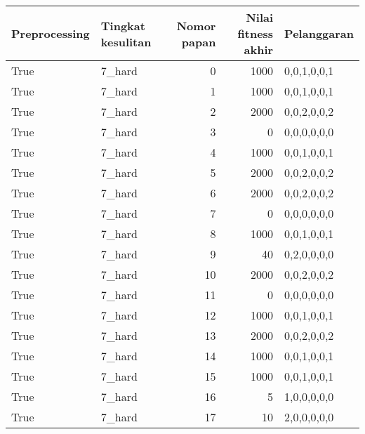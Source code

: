\begin{tabular}{llrrl}
\hline
 Preprocessing   & Tingkat kesulitan   &   Nomor papan &   Nilai fitness akhir & Pelanggaran   \\
\hline
 True            & 7\_hard              &             0 &                  1000 & 0,0,1,0,0,1   \\
 True            & 7\_hard              &             1 &                  1000 & 0,0,1,0,0,1   \\
 True            & 7\_hard              &             2 &                  2000 & 0,0,2,0,0,2   \\
 True            & 7\_hard              &             3 &                     0 & 0,0,0,0,0,0   \\
 True            & 7\_hard              &             4 &                  1000 & 0,0,1,0,0,1   \\
 True            & 7\_hard              &             5 &                  2000 & 0,0,2,0,0,2   \\
 True            & 7\_hard              &             6 &                  2000 & 0,0,2,0,0,2   \\
 True            & 7\_hard              &             7 &                     0 & 0,0,0,0,0,0   \\
 True            & 7\_hard              &             8 &                  1000 & 0,0,1,0,0,1   \\
 True            & 7\_hard              &             9 &                    40 & 0,2,0,0,0,0   \\
 True            & 7\_hard              &            10 &                  2000 & 0,0,2,0,0,2   \\
 True            & 7\_hard              &            11 &                     0 & 0,0,0,0,0,0   \\
 True            & 7\_hard              &            12 &                  1000 & 0,0,1,0,0,1   \\
 True            & 7\_hard              &            13 &                  2000 & 0,0,2,0,0,2   \\
 True            & 7\_hard              &            14 &                  1000 & 0,0,1,0,0,1   \\
 True            & 7\_hard              &            15 &                  1000 & 0,0,1,0,0,1   \\
 True            & 7\_hard              &            16 &                     5 & 1,0,0,0,0,0   \\
 True            & 7\_hard              &            17 &                    10 & 2,0,0,0,0,0   \\

\end{tabular}
